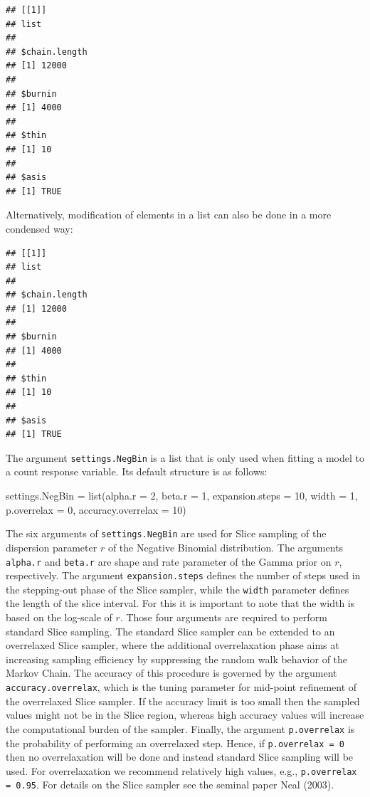 \documentclass[a4paper, preprint, 3p,
authoryear]{elsarticle} %
\newenvironment{Shaded}{\begin{snugshade}}{\end{snugshade}}
\newcommand{\NormalTok}[1]{#1}
\begin{document}
\begin{verbatim}
## [[1]]
## list
## 
## $chain.length
## [1] 12000
## 
## $burnin
## [1] 4000
## 
## $thin
## [1] 10
## 
## $asis
## [1] TRUE
\end{verbatim}

Alternatively, modification of elements in a list can also be done in a
more condensed way:

\begin{Shaded}
\end{Shaded}

\begin{verbatim}
## [[1]]
## list
## 
## $chain.length
## [1] 12000
## 
## $burnin
## [1] 4000
## 
## $thin
## [1] 10
## 
## $asis
## [1] TRUE
\end{verbatim}

The argument \texttt{settings.NegBin} is a list that is only used when
fitting a model to a count response variable. Its default structure is
as follows:

\begin{Shaded}
\begin{Highlighting}[]
\NormalTok{settings.NegBin = list(alpha.r = 2, beta.r = 1, expansion.steps = 10,               }
\NormalTok{                       width = 1, p.overrelax = 0, accuracy.overrelax = 10)}
\end{Highlighting}
\end{Shaded}

The six arguments of \texttt{settings.NegBin} are used for Slice
sampling of the dispersion parameter \(r\) of the Negative Binomial
distribution. The arguments \texttt{alpha.r} and \texttt{beta.r} are
shape and rate parameter of the Gamma prior on \(r\), respectively. The
argument \texttt{expansion.steps} defines the number of steps used in
the stepping-out phase of the Slice sampler, while the \texttt{width}
parameter defines the length of the slice interval. For this it is
important to note that the width is based on the log-scale of \(r\).
Those four arguments are required to perform standard Slice sampling.
The standard Slice sampler can be extended to an overrelaxed Slice
sampler, where the additional overrelaxation phase aims at increasing
sampling efficiency by suppressing the random walk behavior of the
Markov Chain. The accuracy of this procedure is governed by the argument
\texttt{accuracy.overrelax}, which is the tuning parameter for mid-point
refinement of the overrelaxed Slice sampler. If the accuracy limit is
too small then the sampled values might not be in the Slice region,
whereas high accuracy values will increase the computational burden of
the sampler. Finally, the argument \texttt{p.overrelax} is the
probability of performing an overrelaxed step. Hence, if
\texttt{p.overrelax = 0} then no overrelaxation will be done and instead
standard Slice sampling will be used. For overrelaxation we recommend
relatively high values, e.g., \texttt{p.overrelax = 0.95}. For details
on the Slice sampler see the seminal paper Neal (2003).
\end{document}
